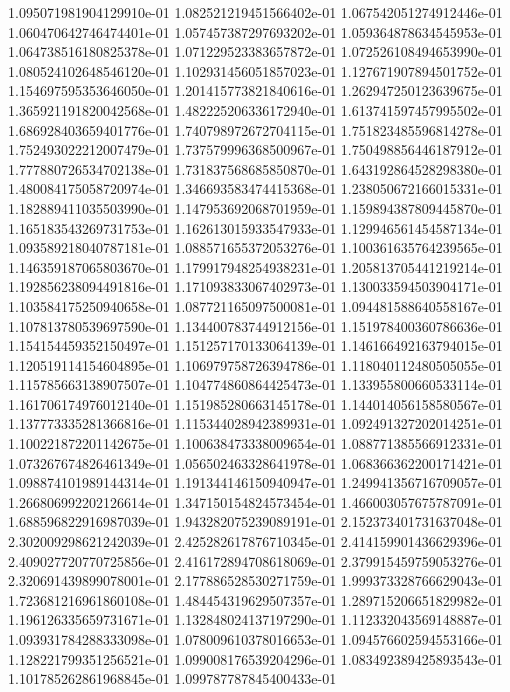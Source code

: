 1.095071981904129910e-01
1.082521219451566402e-01
1.067542051274912446e-01
1.060470642746474401e-01
1.057457387297693202e-01
1.059364878634545953e-01
1.064738516180825378e-01
1.071229523383657872e-01
1.072526108494653990e-01
1.080524102648546120e-01
1.102931456051857023e-01
1.127671907894501752e-01
1.154697595353646050e-01
1.201415773821840616e-01
1.262947250123639675e-01
1.365921191820042568e-01
1.482225206336172940e-01
1.613741597457995502e-01
1.686928403659401776e-01
1.740798972672704115e-01
1.751823485596814278e-01
1.752493022212007479e-01
1.737579996368500967e-01
1.750498856446187912e-01
1.777880726534702138e-01
1.731837568685850870e-01
1.643192864528298380e-01
1.480084175058720974e-01
1.346693583474415368e-01
1.238050672166015331e-01
1.182889411035503990e-01
1.147953692068701959e-01
1.159894387809445870e-01
1.165183543269731753e-01
1.162613015933547933e-01
1.129946561454587134e-01
1.093589218040787181e-01
1.088571655372053276e-01
1.100361635764239565e-01
1.146359187065803670e-01
1.179917948254938231e-01
1.205813705441219214e-01
1.192856238094491816e-01
1.171093833067402973e-01
1.130033594503904171e-01
1.103584175250940658e-01
1.087721165097500081e-01
1.094481588640558167e-01
1.107813780539697590e-01
1.134400783744912156e-01
1.151978400360786636e-01
1.154154459352150497e-01
1.151257170133064139e-01
1.146166492163794015e-01
1.120519114154604895e-01
1.106979758726394786e-01
1.118040112480505055e-01
1.115785663138907507e-01
1.104774860864425473e-01
1.133955800660533114e-01
1.161706174976012140e-01
1.151985280663145178e-01
1.144014056158580567e-01
1.137773335281366816e-01
1.115344028942389931e-01
1.092491327202014251e-01
1.100221872201142675e-01
1.100638473338009654e-01
1.088771385566912331e-01
1.073267674826461349e-01
1.056502463328641978e-01
1.068366362200171421e-01
1.098874101989144314e-01
1.191344146150940947e-01
1.249941356716709057e-01
1.266806992202126614e-01
1.347150154824573454e-01
1.466003057675787091e-01
1.688596822916987039e-01
1.943282075239089191e-01
2.152373401731637048e-01
2.302009298621242039e-01
2.425282617876710345e-01
2.414159901436629396e-01
2.409027720770725856e-01
2.416172894708618069e-01
2.379915459759053276e-01
2.320691439899078001e-01
2.177886528530271759e-01
1.999373328766629043e-01
1.723681216961860108e-01
1.484454319629507357e-01
1.289715206651829982e-01
1.196126335659731671e-01
1.132848024137197290e-01
1.112332043569148887e-01
1.093931784288333098e-01
1.078009610378016653e-01
1.094576602594553166e-01
1.128221799351256521e-01
1.099008176539204296e-01
1.083492389425893543e-01
1.101785262861968845e-01
1.099787787845400433e-01
